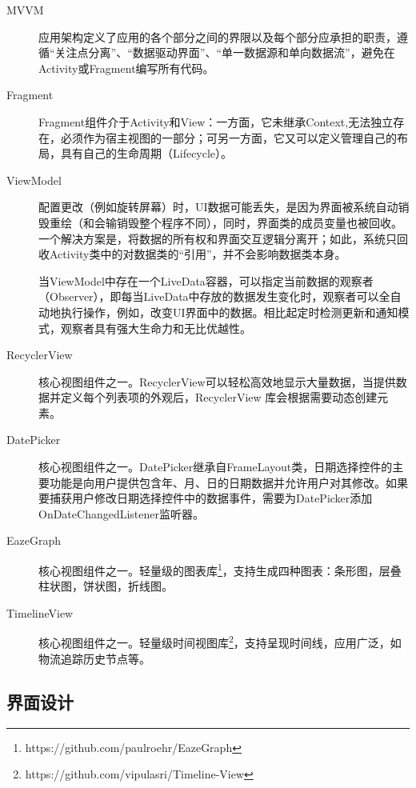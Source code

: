\documentclass[UTF8]{ctexart}
\begin{document}
\begin{description}
    \item[MVVM]
        应用架构定义了应用的各个部分之间的界限以及每个部分应承担的职责，遵循“关注点分离”、“数据驱动界面”、“单一数据源和单向数据流”，避免在Activity或Fragment编写所有代码。
    \item[Fragment]
        Fragment组件介于Activity和View：一方面，它未继承Context,无法独立存在，必须作为宿主视图的一部分；可另一方面，它又可以定义管理自己的布局，具有自己的生命周期（Lifecycle）。
    \item[ViewModel]
        配置更改（例如旋转屏幕）时，UI数据可能丢失，是因为界面被系统自动销毁重绘（和会输销毁整个程序不同），同时，界面类的成员变量也被回收。一个解决方案是，将数据的所有权和界面交互逻辑分离开；如此，系统只回收Activity类中的对数据类的“引用”，并不会影响数据类本身。

        当ViewModel中存在一个LiveData容器，可以指定当前数据的观察者（Observer），即每当LiveData中存放的数据发生变化时，观察者可以全自动地执行操作，例如，改变UI界面中的数据。相比起定时检测更新和通知模式，观察者具有强大生命力和无比优越性。
    \item[RecyclerView] 核心视图组件之一。RecyclerView可以轻松高效地显示大量数据，当提供数据并定义每个列表项的外观后，RecyclerView
        库会根据需要动态创建元素。
    \item[DatePicker]
        核心视图组件之一。DatePicker继承自FrameLayout类，日期选择控件的主要功能是向用户提供包含年、月、日的日期数据并允许用户对其修改。如果要捕获用户修改日期选择控件中的数据事件，需要为DatePicker添加OnDateChangedListener监听器。
    \item[EazeGraph]
        核心视图组件之一。轻量级的图表库\footnote{https://github.com/paulroehr/EazeGraph}，支持生成四种图表：条形图，层叠柱状图，饼状图，折线图。
    \item[TimelineView]
        核心视图组件之一。轻量级时间视图库\footnote{https://github.com/vipulasri/Timeline-View}，支持呈现时间线，应用广泛，如物流追踪历史节点等。

\end{description}

\subsection{界面设计}
\end{document}
